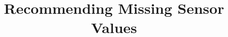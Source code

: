 \documentclass[10pt,nocopyrightspace]{ipsn13}
\title{Recommending Missing Sensor Values}
\numberwithin{equation}{section}
\begin{document}
\makeatletter
\let\@copyrightspace\relax
\makeatother

\maketitle









%


%
\balance

\small{

}
\end{document}
